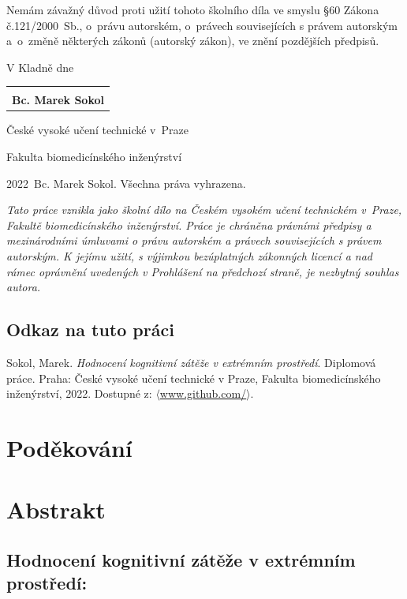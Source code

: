 \documentclass[a4paper,12pt,czech,oneside]{memoir}
\numberwithin{equation}{chapter}
\newcommand{\autor}{Bc. Marek Sokol}
\newcommand{\nazev}{Hodnocení kognitivní zátěže v extrémním prostředí}
\newcommand{\typ}{Diplomová práce}
\newcommand{\rok}{2022}
\begin{document}
\hspace{-0.75cm}Nemám závažný důvod proti užití tohoto školního díla ve smyslu
\S 60 Zákona č.121/2000~Sb., o~právu autorském, o~právech souvisejících s právem
autorským a~o~změně některých zákonů (autorský zákon), ve znění pozdějších
předpisů.
\vspace{1em}

\hspace{-0.75cm} V Kladně dne~
\hfill
\begin{tabular}[t]{@{}c@{}}
	\makebox[12em]{\dotfill} \\
	\textbf{\autor}
\end{tabular}
\clearpage


\null\vfill

\noindent České vysoké učení technické v~Praze

\noindent Fakulta biomedicínského inženýrství

\noindent \textcopyright{} \rok~\autor. Všechna práva vyhrazena.

\noindent \textit{Tato práce vznikla jako školní dílo na Českém vysokém učení
	technickém v~Praze, Fakultě biomedicínského inženýrství. Práce je chráněna
	právními předpisy a mezinárodními úmluvami o právu autorském a právech
	souvisejících s právem autorským. K jejímu užití, s výjimkou bezúplatných
	zákonných licencí a nad rámec oprávnění uvedených v Prohlášení na předchozí
	straně, je nezbytný souhlas autora.}

\subsection*{Odkaz na tuto práci} Sokol, Marek. \textit{\nazev}. \typ. Praha: České vysoké učení technické v Praze, Fakulta biomedicínského inženýrství, 2022. Dostupné z: $\langle$\url{www.github.com/}$\rangle$.
\clearpage

\null\vfill
\section*{Poděkování}

\clearpage

\null\vfill
\section*{Abstrakt}
\subsection*{\nazev:}

\end{document}
